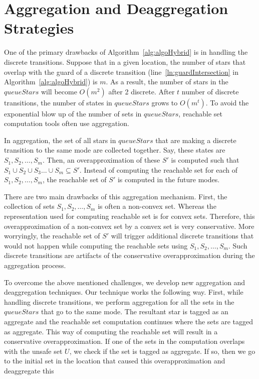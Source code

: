 \section{Aggregation and Deaggregation Strategies}
\label{sec:agdag}

One of the primary drawbacks of Algorithm~\ref{alg:algoHybrid} is in handling the discrete transitions. 
%
Suppose that in a given location, the number of stars that overlap with the guard of a discrete transition (line~\ref{ln:guardIntersection} in Algorithm~\ref{alg:algoHybrid}) is $m$.
%
As a result, the number of stars in the $queueStars$ will become $O(m^2)$ after 2 discrete. After $t$ number of discrete transitions, the number of states in $queueStars$ grows to $O(m^t)$.
%
To avoid the exponential blow up of the number of sets in $queueStars$, reachable set computation tools often use aggregation.

In aggregation, the set of all stars in $queueStars$ that are making a discrete transition to the same mode are collected together. 
%
Say, these states are $S_1, S_2, \ldots, S_m$.
%
Then, an overapproximation of these $S'$ is computed such that $S_1 \cup S_2 \cup S_3 \ldots \cup S_m \subseteq S'$. 
%
Instead of computing the reachable set for each of $S_1, S_2, \ldots, S_m$, the reachable set of $S'$ is computed in the future modes.

There are two main drawbacks of this aggregation mechanism. 
%
First, the collection of sets $S_1, S_2, \ldots, S_m$ is often a non-convex set. 
%
Whereas the representation used for computing reachable set is for convex sets. 
%
Therefore, this overapproximation of a non-convex set by a convex set is very conservative.
%
More worryingly, the reachable set of $S'$ will trigger additional discrete transitions that would not happen while computing the reachable sets using $S_1, S_2, \ldots, S_m$.
%
Such discrete transitions are artifacts of the conservative overapproximation during the aggregation process.


To overcome the above mentioned challenges, we develop new aggregation and deaggregation techniques. Our technique works the following way. 
First, while handling discrete transitions, we perform aggregation for all the sets in the $queueStars$ that go to the same mode. 
%
The resultant star is tagged as an \textsf{aggregate} and the reachable set computation continues where the sets are tagged as \textsf{aggregate}. 
%
This way of computing the reachable set will result in a conservative overapproximation.
%
If one of the sets in the computation overlaps with the unsafe set $U$, we check if the set is tagged as \textsf{aggregate}.
%
If so, then we go to the initial set in the location that caused this overapproximation and deaggregate this 